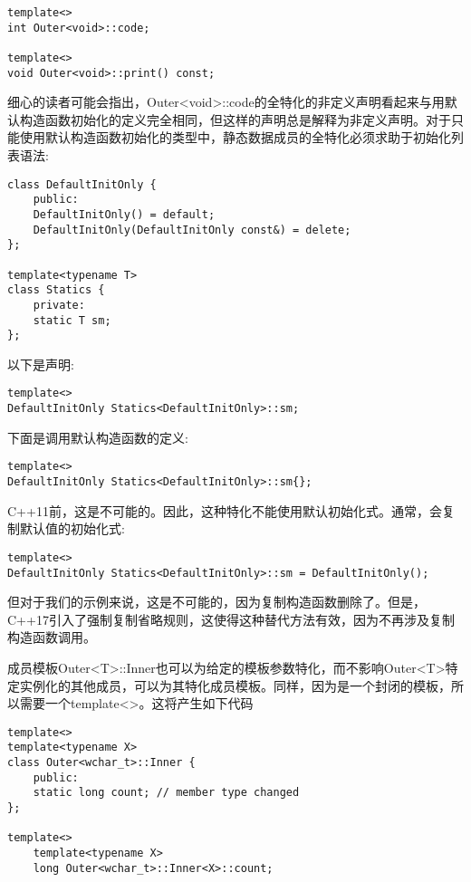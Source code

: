 \begin{lstlisting}[style=styleCXX]
template<>
int Outer<void>::code;

template<>
void Outer<void>::print() const;
\end{lstlisting}

细心的读者可能会指出，Outer<void>::code的全特化的非定义声明看起来与用默认构造函数初始化的定义完全相同，但这样的声明总是解释为非定义声明。对于只能使用默认构造函数初始化的类型中，静态数据成员的全特化必须求助于初始化列表语法:

\begin{lstlisting}[style=styleCXX]
class DefaultInitOnly {
	public:
	DefaultInitOnly() = default;
	DefaultInitOnly(DefaultInitOnly const&) = delete;
};

template<typename T>
class Statics {
	private:
	static T sm;
};
\end{lstlisting}

以下是声明:

\begin{lstlisting}[style=styleCXX]
template<>
DefaultInitOnly Statics<DefaultInitOnly>::sm;
\end{lstlisting}

下面是调用默认构造函数的定义:

\begin{lstlisting}[style=styleCXX]
template<>
DefaultInitOnly Statics<DefaultInitOnly>::sm{};
\end{lstlisting}

C++11前，这是不可能的。因此，这种特化不能使用默认初始化式。通常，会复制默认值的初始化式:

\begin{lstlisting}[style=styleCXX]
template<>
DefaultInitOnly Statics<DefaultInitOnly>::sm = DefaultInitOnly();
\end{lstlisting}

但对于我们的示例来说，这是不可能的，因为复制构造函数删除了。但是，C++17引入了强制复制省略规则，这使得这种替代方法有效，因为不再涉及复制构造函数调用。

成员模板Outer<T>::Inner也可以为给定的模板参数特化，而不影响Outer<T>特定实例化的其他成员，可以为其特化成员模板。同样，因为是一个封闭的模板，所以需要一个template<>。这将产生如下代码

\begin{lstlisting}[style=styleCXX]
template<>
template<typename X>
class Outer<wchar_t>::Inner {
	public:
	static long count; // member type changed
};

template<>
	template<typename X>
	long Outer<wchar_t>::Inner<X>::count;
\end{lstlisting}

